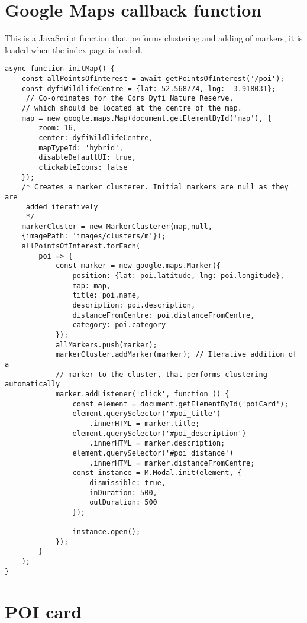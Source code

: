 \section{Google Maps callback function}

This is a JavaScript function that performs clustering and adding of markers, it is loaded when the index page is loaded.

\begin{verbatim}
async function initMap() {
    const allPointsOfInterest = await getPointsOfInterest('/poi');
    const dyfiWildlifeCentre = {lat: 52.568774, lng: -3.918031};
     // Co-ordinates for the Cors Dyfi Nature Reserve,
    // which should be located at the centre of the map.
    map = new google.maps.Map(document.getElementById('map'), {
        zoom: 16,
        center: dyfiWildlifeCentre,
        mapTypeId: 'hybrid',
        disableDefaultUI: true,
        clickableIcons: false
    });
    /* Creates a marker clusterer. Initial markers are null as they are
     added iteratively
     */
    markerCluster = new MarkerClusterer(map,null,
    {imagePath: 'images/clusters/m'});
    allPointsOfInterest.forEach(
        poi => {
            const marker = new google.maps.Marker({
                position: {lat: poi.latitude, lng: poi.longitude},
                map: map,
                title: poi.name,
                description: poi.description,
                distanceFromCentre: poi.distanceFromCentre,
                category: poi.category
            });
            allMarkers.push(marker);
            markerCluster.addMarker(marker); // Iterative addition of a
            // marker to the cluster, that performs clustering automatically
            marker.addListener('click', function () {
                const element = document.getElementById('poiCard');
                element.querySelector('#poi_title')
                	.innerHTML = marker.title;
                element.querySelector('#poi_description')
                	.innerHTML = marker.description;
                element.querySelector('#poi_distance')
                	.innerHTML = marker.distanceFromCentre;
                const instance = M.Modal.init(element, {
                    dismissible: true,
                    inDuration: 500,
                    outDuration: 500
                });

                instance.open();
            });
        }
    );
}
\end{verbatim}

\section{POI card}

